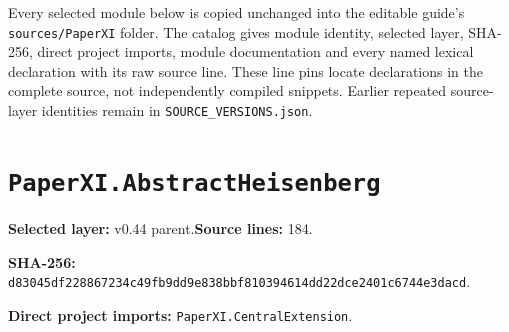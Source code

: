 \documentclass[10pt,oneside]{book}
\begin{document}
Every selected module below is copied unchanged into the editable guide's \texttt{sources/PaperXI} folder. The catalog gives module identity, selected layer, SHA-256, direct project imports, module documentation and every named lexical declaration with its raw source line. These line pins locate declarations in the complete source, not independently compiled snippets. Earlier repeated source-layer identities remain in \texttt{SOURCE\_VERSIONS.json}.

\section{\texorpdfstring{\nolinkurl{PaperXI.AbstractHeisenberg}}{PaperXI.AbstractHeisenberg}}\label{module:PaperXI.AbstractHeisenberg}

\textbf{Selected layer:} v0.44 parent.\quad\textbf{Source lines:} 184.\par\textbf{SHA-256:} {\scriptsize\nolinkurl{d83045df228867234c49fb9dd9e838bbf810394614dd22dce2401c6744e3dacd}}.


\textbf{Direct project imports:} \nolinkurl{PaperXI.CentralExtension}.
\end{document}
